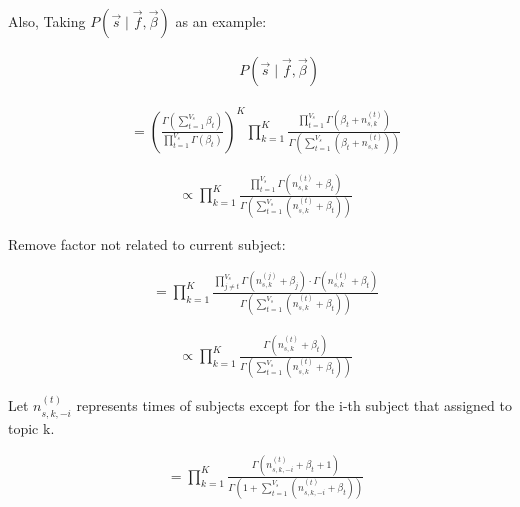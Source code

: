 \documentclass{article}
\begin{document}
Also, Taking $P(\vec{s} \mid  \vec{f}, \vec{\beta})$ as an example:

\begin{equation}
\begin{aligned}
& \qquad P(\vec{s} \mid  \vec{f}, \vec{\beta})
\end{aligned}
\end{equation}


\begin{equation}
\begin{aligned}
&= \left( \frac{\varGamma(\sum_{t=1}^{V_s} \beta_t)}{\prod_{t=1}^{V_s}\varGamma(\beta_t)} \right)^K 
\prod_{k=1}^{K}
\frac{\prod_{t=1}^{V_s}\varGamma(\beta_t+n_{s,k}^{(t)})}{\varGamma(\sum_{t=1}^{V_s} (\beta_t+n_{s,k}^{(t)}))} 
\end{aligned}
\end{equation}


\begin{equation}
\begin{aligned}
&\propto \prod_{k=1}^K \frac{\prod_{t=1}^{V_s} \varGamma(n_{s,k}^{(t)} + \beta_t)}{\varGamma(\sum_{t=1}^{V_s} (n_{s,k}^{(t)}+\beta_t))}
\end{aligned}
\end{equation}

Remove factor not related to current subject:

\begin{equation}
\begin{aligned}
&= \prod_{k=1}^K \frac{\prod_{j\neq t}^{V_s} \varGamma(n_{s,k}^{(j)}+\beta_j) \cdot \varGamma(n_{s,k}^{(t)}+\beta_t)}{\varGamma(\sum_{t=1}^{V_s} (n_{s,k}^{(t)}+\beta_t))}
\end{aligned}
\end{equation}

\begin{equation}
\begin{aligned}
&\propto \prod_{k=1}^K \frac{ \varGamma(n_{s,k}^{(t)}+\beta_t)}{\varGamma(\sum_{t=1}^{V_s} (n_{s,k}^{(t)}+\beta_t))}
\end{aligned}
\end{equation}

Let $n_{s,k,-i}^{(t)}$ represents times of subjects except for the i-th subject that assigned to topic k.

\begin{equation}
\begin{aligned}
&= \prod_{k=1}^K \frac{\varGamma(n_{s,k,-i}^{(t)}+\beta_t+1)}{\varGamma(1+\sum_{t=1}^{V_s}(n_{s,k,-i}^{(t)} + \beta_t))}
\end{aligned}
\end{equation}
\end{document}
